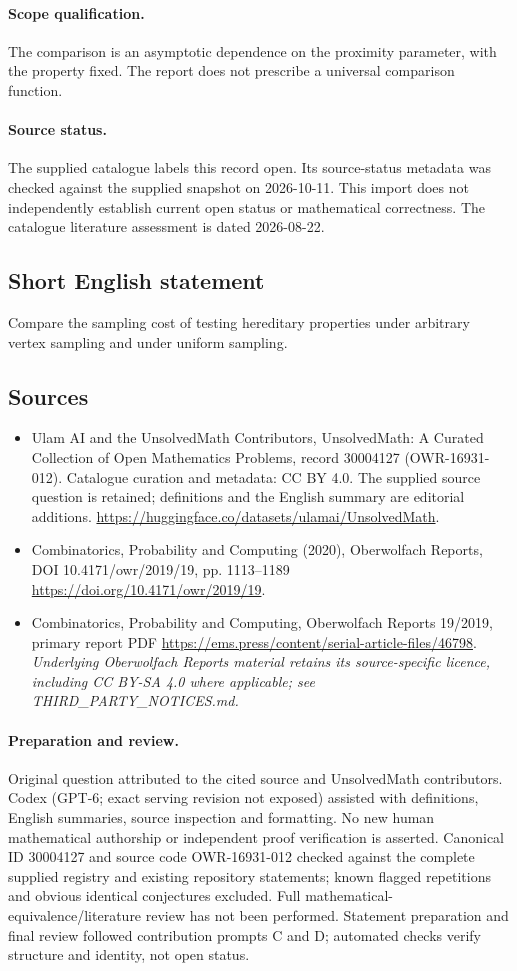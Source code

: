\documentclass[11pt]{article}
\begin{document}
\paragraph{Scope qualification.}
The comparison is an asymptotic dependence on the proximity parameter, with the property fixed. The report does not prescribe a universal comparison function.
\paragraph{Source status.}
The supplied catalogue labels this record open. Its source-status metadata was checked against the supplied snapshot on 2026-10-11. This import does not independently establish current open status or mathematical correctness. The catalogue literature assessment is dated 2026-08-22.
\subsection{Short English statement}
Compare the sampling cost of testing hereditary properties under arbitrary vertex sampling and under uniform sampling.
\subsection{Sources}
\begin{itemize}
\item[S1] Ulam AI and the UnsolvedMath Contributors, UnsolvedMath: A Curated Collection of Open Mathematics Problems, record 30004127 (OWR-16931-012). Catalogue curation and metadata: CC BY 4.0. The supplied source question is retained; definitions and the English summary are editorial additions.
\url{https://huggingface.co/datasets/ulamai/UnsolvedMath}.
\item[S2] Combinatorics, Probability and Computing (2020), Oberwolfach Reports, DOI 10.4171/owr/2019/19, pp. 1113--1189
\url{https://doi.org/10.4171/owr/2019/19}.
\item[S3] Combinatorics, Probability and Computing, Oberwolfach Reports 19/2019, primary report PDF
\url{https://ems.press/content/serial-article-files/46798}.
\textit{Underlying Oberwolfach Reports material retains its source-specific licence, including CC BY-SA 4.0 where applicable; see THIRD\_PARTY\_NOTICES.md.}
\end{itemize}
\paragraph{Preparation and review.}
Original question attributed to the cited source and UnsolvedMath contributors. Codex (GPT-6; exact serving revision not exposed) assisted with definitions, English summaries, source inspection and formatting. No new human mathematical authorship or independent proof verification is asserted. Canonical ID 30004127 and source code OWR-16931-012 checked against the complete supplied registry and existing repository statements; known flagged repetitions and obvious identical conjectures excluded. Full mathematical-equivalence/literature review has not been performed. Statement preparation and final review followed contribution prompts C and D; automated checks verify structure and identity, not open status.
\label{end:30004127}
\end{document}
